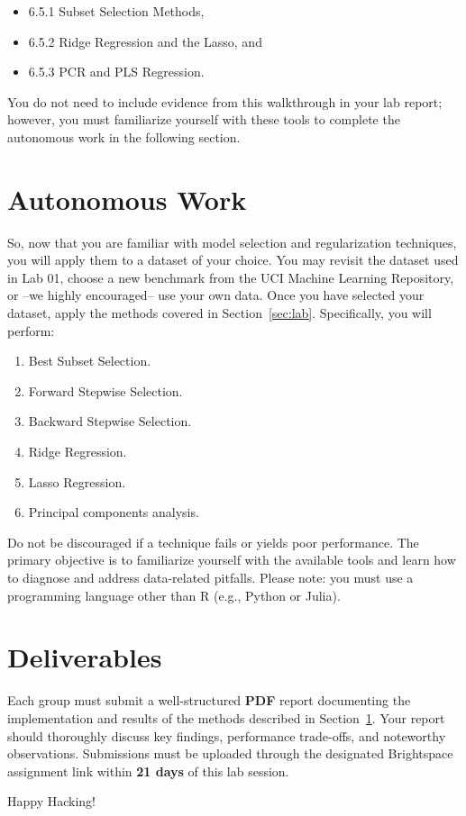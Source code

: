 \documentclass{article}
\begin{document}
\begin{itemize}
\item 6.5.1 Subset Selection Methods,
\item 6.5.2 Ridge Regression and the Lasso, and
\item 6.5.3 PCR and PLS Regression.
\end{itemize}

You do not need to include evidence from this walkthrough in your lab report; however, you must familiarize yourself with these tools to complete the autonomous work in the following section.

\section{Autonomous Work}
\label{sec:work}

So, now that you are familiar with model selection and regularization techniques, you will apply them to a dataset of your choice. You may revisit the dataset used in Lab 01, choose a new benchmark from the UCI Machine Learning Repository, or --we highly encouraged-- use your own data. Once you have selected your dataset, apply the methods covered in Section~\ref{sec:lab}. Specifically, you will perform:

\begin{enumerate}
  \item Best Subset Selection.
  \item Forward Stepwise Selection.
  \item Backward Stepwise Selection.
  \item Ridge Regression.
  \item Lasso Regression.
  \item Principal components analysis.
\end{enumerate}

Do not be discouraged if a technique fails or yields poor performance. The primary objective is to familiarize yourself with the available tools and learn how to diagnose and address data-related pitfalls. Please note: you must use a programming language other than R (e.g., Python or Julia).

\section{Deliverables}
Each group must submit a well-structured \textbf{PDF} report documenting the implementation and results of the methods described in Section~\ref{sec:work}. Your report should thoroughly discuss key findings, performance trade-offs, and noteworthy observations. Submissions must be uploaded through the designated Brightspace\texttrademark{} assignment link within \textbf{21 days} of this lab session.

\vspace{5mm}
Happy Hacking! 
\end{document}
